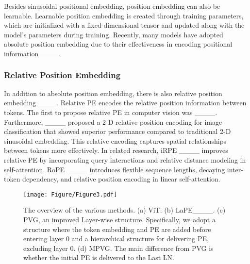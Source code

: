 Besides sinusoidal positional embedding, position embedding can also be learnable. Learnable position embedding is created through training parameters, which are initialized with a fixed-dimensional tensor and updated along with the model's parameters during training. Recently, many models have adopted absolute position embedding due to their effectiveness in encoding positional information____.

\subsubsection{Relative Position Embedding} In addition to absolute position embedding, there is also relative position embedding____. Relative PE encodes the relative position information between tokens. The first to propose relative PE in computer vision was ____. Furthermore, ____ proposed a 2-D relative position encoding for image classification that showed superior performance compared to traditional 2-D sinusoidal embedding. This relative encoding captures spatial relationships between tokens more effectively. In related research, iRPE ____ improves relative PE by incorporating query interactions and relative distance modeling in self-attention. RoPE ____ introduces flexible sequence lengths, decaying inter-token dependency, and relative position encoding in linear self-attention.

\begin{figure*}[t]
\centering
\texttt{[image: Figure/Figure3.pdf]}
\caption{The overview of the various methods. (a) ViT. (b) LaPE____. (c) PVG, an improved Layer-wise structure. Specifically, we adopt a structure where the token embedding and PE are added before entering layer 0 and a hierarchical structure for delivering PE, excluding layer 0. (d) MPVG. The main difference from PVG is whether the initial PE is delivered to the Last LN.} \label{Figure3}

\end{figure*}
